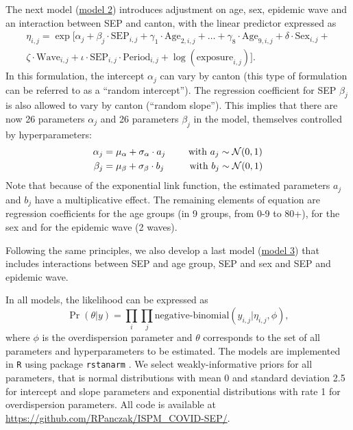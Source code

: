 \documentclass{article}
\begin{document}
	The next model (\underline{model 2}) introduces adjustment on age, sex, epidemic wave and an interaction between SEP and canton, with the linear predictor expressed as
	\begin{align}
		\eta_{i,j} = \exp[ \alpha_j + \beta_j\cdot\text{SEP}_{i,j}  + \gamma_1\cdot\text{Age}_{2,i,j}
		+ \ldots + \gamma_8\cdot\text{Age}_{9,i,j} + \delta\cdot\text{Sex}_{i,j} + \\ \nonumber \zeta\cdot\text{Wave}_{i,j} + \iota\cdot\text{SEP}_{i,j}\cdot\text{Period}_{i,j}  +
		\log(\text{exposure}_{i,j}) ].
		\label{eq:m3}
	\end{align}
	In this formulation, the intercept $\alpha_j$ can vary by canton (this type of formulation can be referred to as a ``random intercept'').
	The regression coefficient for SEP $\beta_j$ is also allowed to vary by canton (``random slope'').
	This implies that there are now 26 parameters $\alpha_j$ and 26 parameters $\beta_j$ in the model, themselves controlled by hyperparameters:
	\begin{align}
		\alpha_j & = \mu_{\alpha} + \sigma_{\alpha}\cdot a_j \text{ \hspace{2.05em}with } a_j \sim \mathcal{N}(0,1) \\ 
		\beta_j & = \mu_{\beta} + \sigma_{\beta}\cdot b_j \text{ \ \hspace{2em}with } b_j \sim \mathcal{N}(0,1) 
		\label{eq:m3b}
	\end{align}
	Note that because of the exponential link function, the estimated parameters $a_j$ and $b_j$ have a multiplicative effect.
	The remaining elements of equation  are regression coefficients for the age groups (in 9 groups, from 0-9 to 80+), for the sex and for the epidemic wave (2 waves). 
	
	Following the same principles, we also develop a last model (\underline{model 3}) that includes interactions between SEP and age group, SEP and sex and SEP and epidemic wave.
	
	In all models, the likelihood can be expressed as
	\begin{equation}
		\Pr(\theta | y) = \prod_i \prod_j  \text{negative-binomial}(y_{i,j} | \eta_{i,j},\phi),
	\end{equation}
	where $\phi$ is the overdispersion parameter and $\theta$ corresponds to the set of all parameters and hyperparameters to be estimated.
	The models are implemented in \texttt{R} using package \texttt{rstanarm} \cite{goodrich2020brilleman}.
	We select weakly-informative priors for all parameters, that is normal distributions with mean 0 and standard deviation 2.5 for intercept and slope parameters and exponential distributions with rate 1 for overdispersion parameters.
	All code is available at \url{https://github.com/RPanczak/ISPM_COVID-SEP/}.
	
\end{document}
